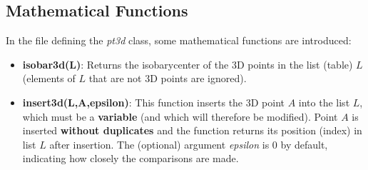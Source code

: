 \subsection{Mathematical Functions}

In the file defining the \emph{pt3d} class, some mathematical functions are introduced:
\begin{itemize}
    \item \textbf{isobar3d(L)}: Returns the isobarycenter of the 3D points in the list (table) $L$ (elements of $L$ that are not 3D points are ignored).
    \item \textbf{insert3d(L,A,epsilon)}: This function inserts the 3D point $A$ into the list $L$, which must be a \textbf{variable} (and which will therefore be modified). Point $A$ is inserted \textbf{without duplicates} and the function returns its position (index) in list $L$ after insertion. The (optional) argument \emph{epsilon} is $0$ by default, indicating how closely the comparisons are made.
\end{itemize}
